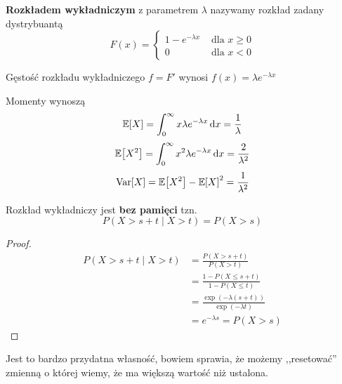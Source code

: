 \begin{definition}
	\textbf{Rozkładem wykładniczym} z parametrem \( \lambda \) nazywamy rozkład zadany dystrybuantą
	\[
		F(x) = \begin{cases}
			1 - e^{-\lambda x} & \text{ dla } x \geq 0 \\
			0                  & \text{ dla } x < 0
		\end{cases}
	\]
\end{definition}

Gęstość rozkładu wykładniczego \( f = F' \) wynosi \( f(x) = \lambda e^{-\lambda x} \)

Momenty wynoszą
\[
	\expected{X} = \int_0^\infty x\lambda e^{-\lambda x} \diff x = \frac{1}{\lambda}
\]
\[
	\expected{X^2} = \int_0^\infty x^2\lambda e^{-\lambda x} \diff x = \frac{2}{\lambda^2}
\]
\[
	\variance{X} = \expected{X^2} - \expected{X}^2 = \frac{1}{\lambda^2}
\]

\begin{theorem}[Lemat 8.4 P\&C]
	Rozkład wykładniczy jest \textbf{bez pamięci} tzn.
	\[
		P(X > s + t \mid X > t) = P(X > s)
	\]
\end{theorem}
\begin{proof}
	\begin{align*}
		P(X > s + t \mid X > t) & = \frac{P(X > s + t)}{P(X > t)}                  \\
		                        & = \frac{1 - P(X \leq s + t)}{1 - P(X \leq t)}    \\
		                        & = \frac{\exp(-\lambda(s + t))}{\exp(-\lambda t)} \\
		                        & = e^{-\lambda s} = P(X > s)
	\end{align*}
\end{proof}

Jest to bardzo przydatna własność, bowiem sprawia, że możemy ,,resetować'' zmienną o której wiemy, że ma większą wartość niż ustalona.

